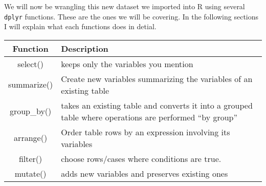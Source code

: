 \documentclass[]{book}
\begin{document}
We will now be wrangling this new dataset we imported into R using
several \texttt{dplyr} functions. These are the ones we will be
covering. In the following sections I will explain what each functions
does in detial.

\begin{longtable}[]{@{}cl@{}}
\toprule
\begin{minipage}[b]{0.21\columnwidth}\centering\strut
Function\strut
\end{minipage} & \begin{minipage}[b]{0.18\columnwidth}\raggedright\strut
Description\strut
\end{minipage}\tabularnewline
\midrule
\endhead
\begin{minipage}[t]{0.21\columnwidth}\centering\strut
select()\strut
\end{minipage} & \begin{minipage}[t]{0.18\columnwidth}\raggedright\strut
keeps only the variables you mention\strut
\end{minipage}\tabularnewline
\begin{minipage}[t]{0.21\columnwidth}\centering\strut
summarize()\strut
\end{minipage} & \begin{minipage}[t]{0.18\columnwidth}\raggedright\strut
Create new variables summarizing the variables of an existing
table\strut
\end{minipage}\tabularnewline
\begin{minipage}[t]{0.21\columnwidth}\centering\strut
group\_by()\strut
\end{minipage} & \begin{minipage}[t]{0.18\columnwidth}\raggedright\strut
takes an existing table and converts it into a grouped table where
operations are performed ``by group''\strut
\end{minipage}\tabularnewline
\begin{minipage}[t]{0.21\columnwidth}\centering\strut
arrange()\strut
\end{minipage} & \begin{minipage}[t]{0.18\columnwidth}\raggedright\strut
Order table rows by an expression involving its variables\strut
\end{minipage}\tabularnewline
\begin{minipage}[t]{0.21\columnwidth}\centering\strut
filter()\strut
\end{minipage} & \begin{minipage}[t]{0.18\columnwidth}\raggedright\strut
choose rows/cases where conditions are true.\strut
\end{minipage}\tabularnewline
\begin{minipage}[t]{0.21\columnwidth}\centering\strut
mutate()\strut
\end{minipage} & \begin{minipage}[t]{0.18\columnwidth}\raggedright\strut
adds new variables and preserves existing ones\strut
\end{minipage}\tabularnewline
\bottomrule
\end{longtable}
\end{document}
